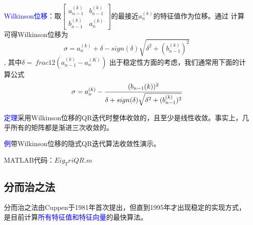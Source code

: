 \documentclass[12pt,a4paper]{article}
\begin{document}
\textcolor{blue}{Wilkinson位移：}取$\begin{bmatrix}a_{n-1}^{(k)}&b_{n-1}^{(k)}\\
b_{n-1}^{(k)}&a_n^{(k)} \end{bmatrix}$的最接近$a_n^{(k)}$的特征值作为位移。通过
计算可得Wilkinson位移为
$$\sigma =a_n^{(k)}+\delta -sign(\delta)\sqrt{\delta
^2+(b_{n-1}^{(k)})^2}$$,
其中$\delta=\
frac{1}{2}(a_{n-1}^{(k)}-a_n^{(K)})$
出于稳定性方面的考虑，我们通常用下面的计算公式\begin{equation}
\sigma=a_n^{(k)}-\cfrac{(b_{n-1}{(k)})^2}{\delta +sign(\delta)\sqrt{\delta
	^2+(b_{n-1}^{(k)})^2}}
\end{equation}

\textcolor{blue}{定理}\quad 采用Wilkinson位移的QR迭代时整体收敛的，且至少是线性收敛。事实上，几乎所有的矩阵都是渐进三次收敛的。

\textcolor{blue}{例}\quad 带Wilkinson位移的隐式QR迭代算法收敛性演示。

MATLAB代码：$Eig_TriQR.m$
\subsection{分而治之法}
分而治之法由Cuppen于1981年首次提出，但直到1995年才出现稳定的实现方式，是目前计算\textcolor{blue}{所有特征值和特征向量}的最快算法。
\end{document}
